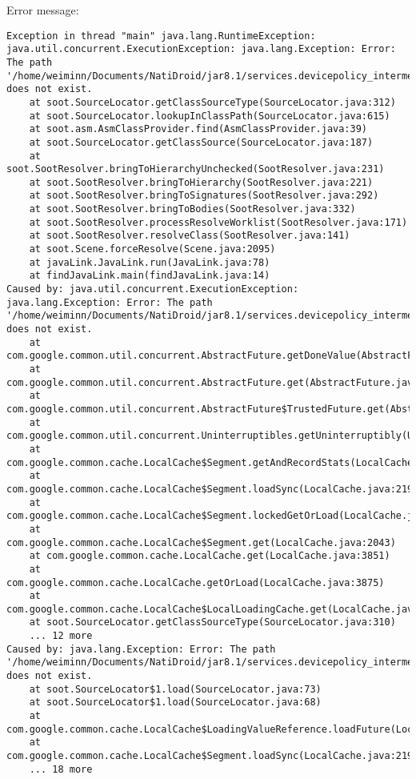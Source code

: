 Error message:
\begin{lstlisting}
Exception in thread "main" java.lang.RuntimeException: java.util.concurrent.ExecutionException: java.lang.Exception: Error: The path '/home/weiminn/Documents/NatiDroid/jar8.1/services.devicepolicy_intermediates.jar' does not exist.
    at soot.SourceLocator.getClassSourceType(SourceLocator.java:312)
    at soot.SourceLocator.lookupInClassPath(SourceLocator.java:615)
    at soot.asm.AsmClassProvider.find(AsmClassProvider.java:39)
    at soot.SourceLocator.getClassSource(SourceLocator.java:187)
    at soot.SootResolver.bringToHierarchyUnchecked(SootResolver.java:231)
    at soot.SootResolver.bringToHierarchy(SootResolver.java:221)
    at soot.SootResolver.bringToSignatures(SootResolver.java:292)
    at soot.SootResolver.bringToBodies(SootResolver.java:332)
    at soot.SootResolver.processResolveWorklist(SootResolver.java:171)
    at soot.SootResolver.resolveClass(SootResolver.java:141)
    at soot.Scene.forceResolve(Scene.java:2095)
    at javaLink.JavaLink.run(JavaLink.java:78)
    at findJavaLink.main(findJavaLink.java:14)
Caused by: java.util.concurrent.ExecutionException: java.lang.Exception: Error: The path '/home/weiminn/Documents/NatiDroid/jar8.1/services.devicepolicy_intermediates.jar' does not exist.
    at com.google.common.util.concurrent.AbstractFuture.getDoneValue(AbstractFuture.java:552)
    at com.google.common.util.concurrent.AbstractFuture.get(AbstractFuture.java:513)
    at com.google.common.util.concurrent.AbstractFuture$TrustedFuture.get(AbstractFuture.java:90)
    at com.google.common.util.concurrent.Uninterruptibles.getUninterruptibly(Uninterruptibles.java:197)
    at com.google.common.cache.LocalCache$Segment.getAndRecordStats(LocalCache.java:2229)
    at com.google.common.cache.LocalCache$Segment.loadSync(LocalCache.java:2195)
    at com.google.common.cache.LocalCache$Segment.lockedGetOrLoad(LocalCache.java:2153)
    at com.google.common.cache.LocalCache$Segment.get(LocalCache.java:2043)
    at com.google.common.cache.LocalCache.get(LocalCache.java:3851)
    at com.google.common.cache.LocalCache.getOrLoad(LocalCache.java:3875)
    at com.google.common.cache.LocalCache$LocalLoadingCache.get(LocalCache.java:4800)
    at soot.SourceLocator.getClassSourceType(SourceLocator.java:310)
    ... 12 more
Caused by: java.lang.Exception: Error: The path '/home/weiminn/Documents/NatiDroid/jar8.1/services.devicepolicy_intermediates.jar' does not exist.
    at soot.SourceLocator$1.load(SourceLocator.java:73)
    at soot.SourceLocator$1.load(SourceLocator.java:68)
    at com.google.common.cache.LocalCache$LoadingValueReference.loadFuture(LocalCache.java:3445)
    at com.google.common.cache.LocalCache$Segment.loadSync(LocalCache.java:2194)
    ... 18 more
\end{lstlisting}

